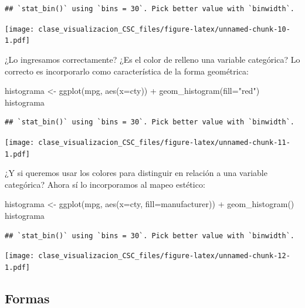 \documentclass[
]{book}
\newenvironment{Shaded}{\begin{snugshade}}{\end{snugshade}}
\newcommand{\AttributeTok}[1]{\textcolor[rgb]{0.77,0.63,0.00}{#1}}
\newcommand{\FunctionTok}[1]{\textcolor[rgb]{0.00,0.00,0.00}{#1}}
\newcommand{\NormalTok}[1]{#1}
\newcommand{\OtherTok}[1]{\textcolor[rgb]{0.56,0.35,0.01}{#1}}
\newcommand{\SpecialCharTok}[1]{\textcolor[rgb]{0.00,0.00,0.00}{#1}}
\newcommand{\StringTok}[1]{\textcolor[rgb]{0.31,0.60,0.02}{#1}}
\begin{document}
\begin{verbatim}
## `stat_bin()` using `bins = 30`. Pick better value with `binwidth`.
\end{verbatim}

\texttt{[image: clase\_visualizacion\_CSC\_files/figure-latex/unnamed-chunk-10-1.pdf]}

¿Lo ingresamos correctamente? ¿Es el color de relleno una variable categórica? Lo correcto es incorporarlo como característica de la forma geométrica:

\begin{Shaded}
\begin{Highlighting}[]
\NormalTok{histograma }\OtherTok{\textless{}{-}} \FunctionTok{ggplot}\NormalTok{(mpg, }\FunctionTok{aes}\NormalTok{(}\AttributeTok{x=}\NormalTok{cty)) }\SpecialCharTok{+} 
  \FunctionTok{geom\_histogram}\NormalTok{(}\AttributeTok{fill=}\StringTok{"red"}\NormalTok{)}
\NormalTok{histograma}
\end{Highlighting}
\end{Shaded}

\begin{verbatim}
## `stat_bin()` using `bins = 30`. Pick better value with `binwidth`.
\end{verbatim}

\texttt{[image: clase\_visualizacion\_CSC\_files/figure-latex/unnamed-chunk-11-1.pdf]}

¿Y si queremos usar los colores para distinguir en relación a una variable categórica? Ahora sí lo incorporamos al mapeo estético:

\begin{Shaded}
\begin{Highlighting}[]
\NormalTok{histograma }\OtherTok{\textless{}{-}} \FunctionTok{ggplot}\NormalTok{(mpg, }\FunctionTok{aes}\NormalTok{(}\AttributeTok{x=}\NormalTok{cty, }\AttributeTok{fill=}\NormalTok{manufacturer)) }\SpecialCharTok{+} 
  \FunctionTok{geom\_histogram}\NormalTok{()}
\NormalTok{histograma}
\end{Highlighting}
\end{Shaded}

\begin{verbatim}
## `stat_bin()` using `bins = 30`. Pick better value with `binwidth`.
\end{verbatim}

\texttt{[image: clase\_visualizacion\_CSC\_files/figure-latex/unnamed-chunk-12-1.pdf]}

\hypertarget{formas}{%
\subsection{Formas}\label{formas}}
\end{document}
